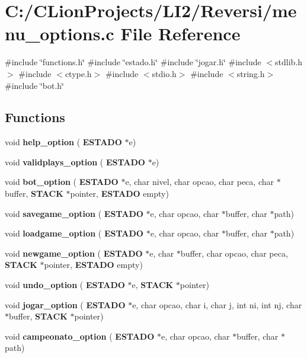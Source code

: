 \section{C\+:/\+C\+Lion\+Projects/\+L\+I2/\+Reversi/menu\+\_\+options.c File Reference}
\label{menu__options_8c}
{\ttfamily \#include \char`\"{}functions.\+h\char`\"{}}\newline
{\ttfamily \#include \char`\"{}estado.\+h\char`\"{}}\newline
{\ttfamily \#include \char`\"{}jogar.\+h\char`\"{}}\newline
{\ttfamily \#include $<$stdlib.\+h$>$}\newline
{\ttfamily \#include $<$ctype.\+h$>$}\newline
{\ttfamily \#include $<$stdio.\+h$>$}\newline
{\ttfamily \#include $<$string.\+h$>$}\newline
{\ttfamily \#include \char`\"{}bot.\+h\char`\"{}}\newline
\subsection*{Functions}
\begin{DoxyCompactItemize}
\item 
void \textbf{ help\+\_\+option} (\textbf{ E\+S\+T\+A\+DO} $\ast$e)
\item 
void \textbf{ validplays\+\_\+option} (\textbf{ E\+S\+T\+A\+DO} $\ast$e)
\item 
void \textbf{ bot\+\_\+option} (\textbf{ E\+S\+T\+A\+DO} $\ast$e, char nivel, char opcao, char peca, char $\ast$buffer, \textbf{ S\+T\+A\+CK} $\ast$pointer, \textbf{ E\+S\+T\+A\+DO} empty)
\item 
void \textbf{ savegame\+\_\+option} (\textbf{ E\+S\+T\+A\+DO} $\ast$e, char opcao, char $\ast$buffer, char $\ast$path)
\item 
void \textbf{ loadgame\+\_\+option} (\textbf{ E\+S\+T\+A\+DO} $\ast$e, char opcao, char $\ast$buffer, char $\ast$path)
\item 
void \textbf{ newgame\+\_\+option} (\textbf{ E\+S\+T\+A\+DO} $\ast$e, char $\ast$buffer, char opcao, char peca, \textbf{ S\+T\+A\+CK} $\ast$pointer, \textbf{ E\+S\+T\+A\+DO} empty)
\item 
void \textbf{ undo\+\_\+option} (\textbf{ E\+S\+T\+A\+DO} $\ast$e, \textbf{ S\+T\+A\+CK} $\ast$pointer)
\item 
void \textbf{ jogar\+\_\+option} (\textbf{ E\+S\+T\+A\+DO} $\ast$e, char opcao, char i, char j, int ni, int nj, char $\ast$buffer, \textbf{ S\+T\+A\+CK} $\ast$pointer)
\item 
void \textbf{ campeonato\+\_\+option} (\textbf{ E\+S\+T\+A\+DO} $\ast$e, char opcao, char $\ast$buffer, char $\ast$path)
\end{DoxyCompactItemize}


